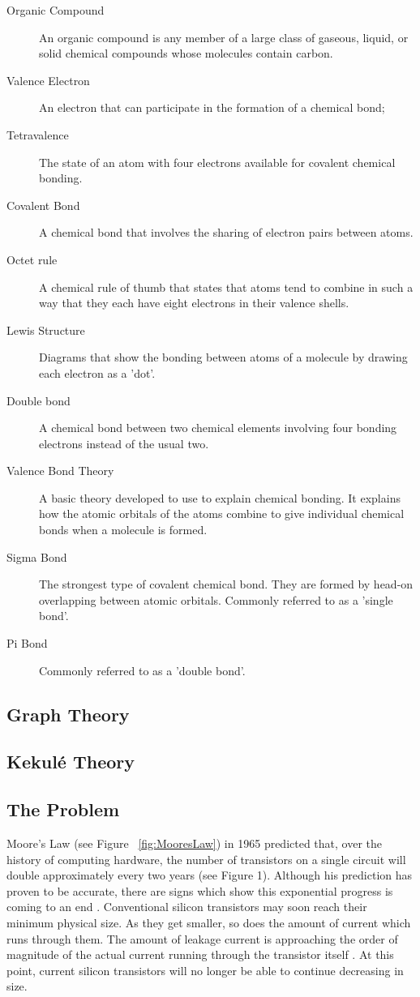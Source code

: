 \documentclass[12pt]{article}
\begin{document}
\begin{description}
\item[Organic Compound] An organic compound is any member of a large class of gaseous, liquid, or solid chemical compounds whose molecules contain carbon.
\item[Valence Electron] An electron that can participate in the formation of a chemical bond; 
\item[Tetravalence] The state of an atom with four electrons available for covalent chemical bonding.
\item[Covalent Bond] A chemical bond that involves the sharing of electron pairs between atoms.
\item[Octet rule] A chemical rule of thumb that states that atoms tend to combine in such a way that they each have eight electrons in their valence shells.
\item[Lewis Structure] Diagrams that show the bonding between atoms of a molecule by drawing each electron as a 'dot'.
\item[Double bond] A chemical bond between two chemical elements involving four bonding electrons instead of the usual two.
\item[Valence Bond Theory] A basic theory developed to use to explain chemical bonding. It explains how the atomic orbitals of the atoms combine to give individual chemical bonds when a molecule is formed. 
\item[Sigma Bond] The strongest type of covalent chemical bond. They are formed by head-on overlapping between atomic orbitals. Commonly referred to as a 'single bond'.
\item[Pi Bond] Commonly referred to as a 'double bond'.
\end{description}

\subsection{Graph Theory}

\subsection{Kekul\'e Theory}

\subsection{The Problem}


Moore's Law (see Figure ~\ref{fig:MooresLaw}) in 1965 \cite{Moore} predicted that, over the history of computing hardware, the number of transistors on a single circuit will double approximately every two years (see Figure 1). Although his prediction has proven to be accurate, there are signs which show this exponential progress is coming to an end \cite{MooreEnd}. Conventional silicon transistors may soon reach their minimum physical size. As they get smaller, so does the amount of current which runs through them. The amount of leakage current is approaching the order of magnitude of the actual current running through the transistor itself \cite{v06}. At this point, current silicon transistors will no longer be able to continue decreasing in size.
\end{document}

